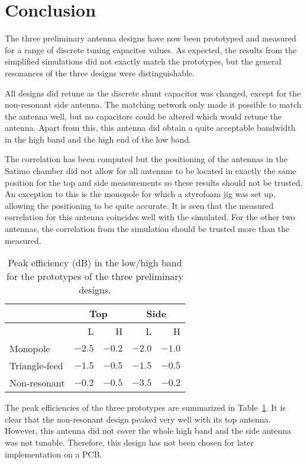 \section{Conclusion}
The three preliminary antenna designs have now been prototyped and measured for a range of discrete tuning capacitor values. As expected, the results from the simplified simulations did not exactly match the prototypes, but the general resonances of the three designs were distinguishable.

All designs did retune as the discrete shunt capacitor was changed, except for the non-resonant side antenna. The matching network only made it possible to match the antenna well, but no capacitors could be altered which would retune the antenna. Apart from this, this antenna did obtain a quite acceptable bandwidth in the high band and the high end of the low band.

The correlation has been computed but the positioning of the antennas in the Satimo chamber did not allow for all antennas to be located in exactly the same position for the top and side measurements so these results should not be trusted. An exception to this is the monopole for which a styrofoam jig was set up, allowing the positioning to be quite accurate. It is seen that the measured correlation for this antenna coincides well with the simulated. For the other two antennas, the correlation from the simulation should be trusted more than the measured.

\begin{table}[htbp]
    \centering
    \begin{tabular}{|l|r|r|r|r|}
        \hline
        & \multicolumn{2}{c|}{Top} & \multicolumn{2}{c|}{Side} \\
        \hline
        & L & H & L & H \\
        \hline
        Monopole & $-2.5$ & $-0.2$ & $-2.0$ & $-1.0$ \\
        Triangle-feed & $-1.5$ & $-0.5$ & $-1.5$ & $-0.5$ \\
        Non-resonant & $-0.2$ & $-0.5$ & $-3.5$ & $-0.2$ \\
        \hline
    \end{tabular}
    \caption{Peak efficiency (dB) in the low/high band for the prototypes of the three preliminary designs.}
    \label{tab:peakefficiencyproto}
\end{table}

The peak efficiencies of the three prototypes are summarized in Table~\ref{tab:peakefficiencyproto}. It is clear that the non-resonant design peaked very well with its top antenna. However, this antenna did not cover the whole high band and the side antenna was not tunable. Therefore, this design has not been chosen for later implementation on a PCB.

